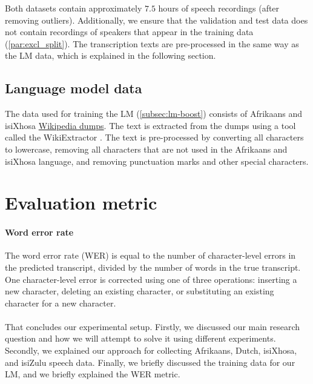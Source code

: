 Both datasets contain approximately $7.5$ hours of speech recordings (after removing outliers). 
Additionally, we ensure that the validation and test data does not contain recordings of speakers that appear in the training data (\ref{par:excl_split}).
The transcription texts are pre-processed in the same way as the LM data, which is explained in the following section.

\newpage

\subsection{Language model data}
The data used for training the LM (\ref{subsec:lm-boost}) consists of Afrikaans and isiXhosa \href{https://dumps.wikimedia.org/}{Wikipedia dumps}.
The text is extracted from the dumps using a tool called the WikiExtractor \cite{Wikiextractor2015}.
The text is pre-processed by converting all characters to lowercase, removing all characters that are not used in the Afrikaans
and isiXhosa language, and removing punctuation marks and other special characters.

\section{Evaluation metric}

\paragraph*{Word error rate} \label{subsec:wer}
The word error rate (WER) \cite{WordErrorRate} is equal to the number of character-level errors in the predicted transcript, 
divided by the number of words in the true transcript. One character-level error is corrected using one of three operations:
inserting a new character, deleting an existing character, or substituting an existing character for a new character.
\\
\\
That concludes our experimental setup. Firstly, we discussed our main research question and how we will attempt to solve it using different experiments.
Secondly, we explained our approach for collecting Afrikaans, Dutch, isiXhosa, and isiZulu speech data.
Finally, we briefly discussed the training data for our LM, and we briefly explained the WER metric.